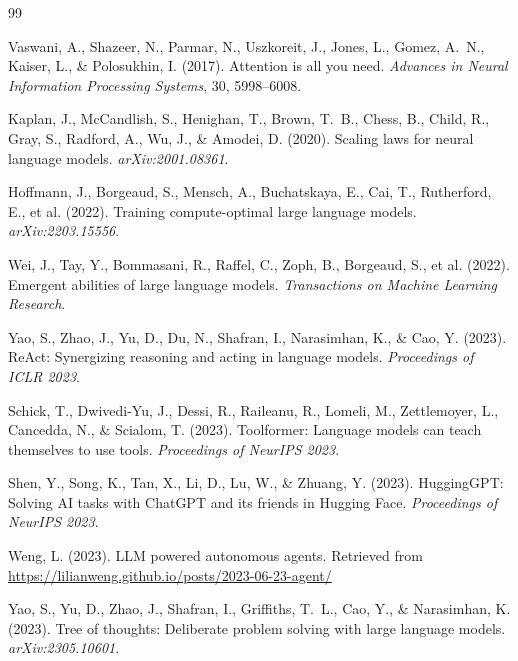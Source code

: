 \documentclass[12pt,a4paper]{report}
\begin{document}
\newpage
{}

\begin{thebibliography}{99}

Vaswani, A., Shazeer, N., Parmar, N., Uszkoreit, J., Jones, L., Gomez, A.~N., Kaiser, L., \& Polosukhin, I. (2017). Attention is all you need. \textit{Advances in Neural Information Processing Systems}, 30, 5998--6008.

Kaplan, J., McCandlish, S., Henighan, T., Brown, T.~B., Chess, B., Child, R., Gray, S., Radford, A., Wu, J., \& Amodei, D. (2020). Scaling laws for neural language models. \textit{arXiv:2001.08361}.

Hoffmann, J., Borgeaud, S., Mensch, A., Buchatskaya, E., Cai, T., Rutherford, E., et al. (2022). Training compute-optimal large language models. \textit{arXiv:2203.15556}.

Wei, J., Tay, Y., Bommasani, R., Raffel, C., Zoph, B., Borgeaud, S., et al. (2022). Emergent abilities of large language models. \textit{Transactions on Machine Learning Research}.

Yao, S., Zhao, J., Yu, D., Du, N., Shafran, I., Narasimhan, K., \& Cao, Y. (2023). ReAct: Synergizing reasoning and acting in language models. \textit{Proceedings of ICLR 2023}.

Schick, T., Dwivedi-Yu, J., Dessi, R., Raileanu, R., Lomeli, M., Zettlemoyer, L., Cancedda, N., \& Scialom, T. (2023). Toolformer: Language models can teach themselves to use tools. \textit{Proceedings of NeurIPS 2023}.

Shen, Y., Song, K., Tan, X., Li, D., Lu, W., \& Zhuang, Y. (2023). HuggingGPT: Solving AI tasks with ChatGPT and its friends in Hugging Face. \textit{Proceedings of NeurIPS 2023}.

Weng, L. (2023). LLM powered autonomous agents. Retrieved from \url{https://lilianweng.github.io/posts/2023-06-23-agent/}

Yao, S., Yu, D., Zhao, J., Shafran, I., Griffiths, T.~L., Cao, Y., \& Narasimhan, K. (2023). Tree of thoughts: Deliberate problem solving with large language models. \textit{arXiv:2305.10601}.


\end{thebibliography}
\end{document}
